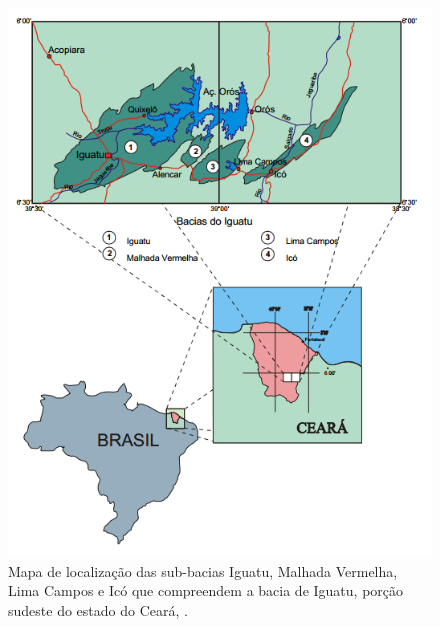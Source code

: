 \begin{figure}[h]
\centering
\includegraphics[width=1.0\linewidth]{Figs/baciasdo_iguatu}
\caption{Mapa de localização das sub-bacias Iguatu, Malhada Vermelha, Lima Campos e Icó que compreendem a bacia de Iguatu, porção sudeste do estado do Ceará, \citep{Ribeiro_2000}.}
\label{fig:localizacao_igatu}
\end{figure}



